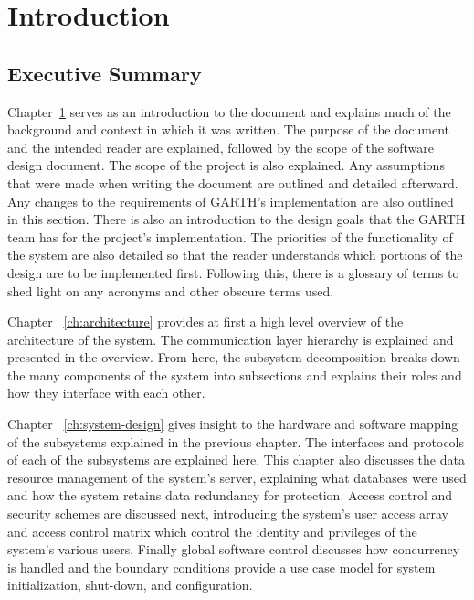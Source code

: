 \documentclass{report}
\begin{document}

\tableofcontents
\listoffigures
\listoftables
\chapter{Introduction} %
\label{ch:introduction}

\section{Executive Summary}

Chapter~\ref{ch:introduction} serves as 
an introduction to the document and explains much of the background and context 
in which it was written. The purpose of the document and the intended reader are
explained, followed by the scope of the software design document. The
scope of the project is also explained. Any assumptions that were made when writing the 
document are outlined and detailed afterward. Any changes to the requirements of
GARTH's implementation are also outlined in this section. There is also an 
introduction to the design goals that the GARTH team has for the project's 
implementation. The priorities of the functionality of the system are also detailed so 
that the reader understands which portions of the design are to be implemented first. 
Following this, there is a glossary of terms to shed light on any acronyms and other 
obscure terms used.

Chapter ~\ref{ch:architecture} provides at first a high level overview of the 
architecture of the system. The communication layer hierarchy is explained and
presented in the overview. From here, the subsystem decomposition breaks down
the many components of the system into subsections and explains their roles and
how they interface with each other.

Chapter ~\ref{ch:system-design} gives insight to the hardware and software
mapping of the subsystems explained in the previous chapter. The interfaces
and protocols of each of the subsystems are explained here. This chapter also
discusses the data resource management of the system's server, explaining what
databases were used and how the system retains data redundancy for protection.
Access control and security schemes are discussed next, introducing the system's
user access array and access control matrix which control the identity and 
privileges of the system's various users. Finally global software control 
discusses how concurrency is handled and the boundary conditions provide a use
case model for system initialization, shut-down, and configuration.
\end{document}
